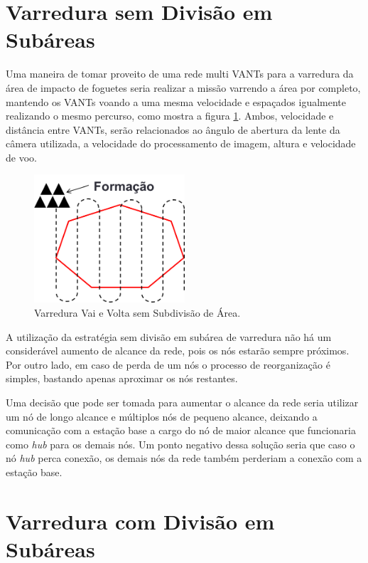 \section{Varredura sem Divisão em Subáreas}

Uma maneira de tomar proveito de uma rede multi VANTs para a varredura da área de impacto de foguetes seria realizar a missão varrendo a área por completo, mantendo os VANTs voando a uma mesma velocidade e espaçados igualmente realizando o mesmo percurso, como mostra a figura \ref{fig:semsubdivisao}. Ambos, velocidade e distância entre VANTs, serão relacionados ao ângulo de abertura da lente da câmera utilizada, a velocidade do processamento de imagem, altura e velocidade de voo.

\begin{figure} 
\center
\includegraphics[width=0.5\textwidth]{semsubdivisao.png}
\caption{Varredura Vai e Volta sem Subdivisão de Área.} 
\label{fig:semsubdivisao}
\end{figure}

A utilização da estratégia sem divisão em subárea de varredura não há um considerável aumento de alcance da rede, pois os nós estarão sempre próximos. Por outro lado, em caso de perda de um nós o processo de reorganização é simples, bastando apenas aproximar os nós restantes. 

Uma decisão que pode ser tomada para aumentar o alcance da rede seria utilizar um nó de longo alcance e múltiplos nós de pequeno alcance, deixando a comunicação com a estação base a cargo do nó de maior alcance que funcionaria como \emph{hub} para os demais nós. Um ponto negativo dessa solução seria que caso o nó \emph{hub} perca conexão, os demais nós da rede também perderiam a conexão com a estação base. 

\section{Varredura com Divisão em Subáreas}

